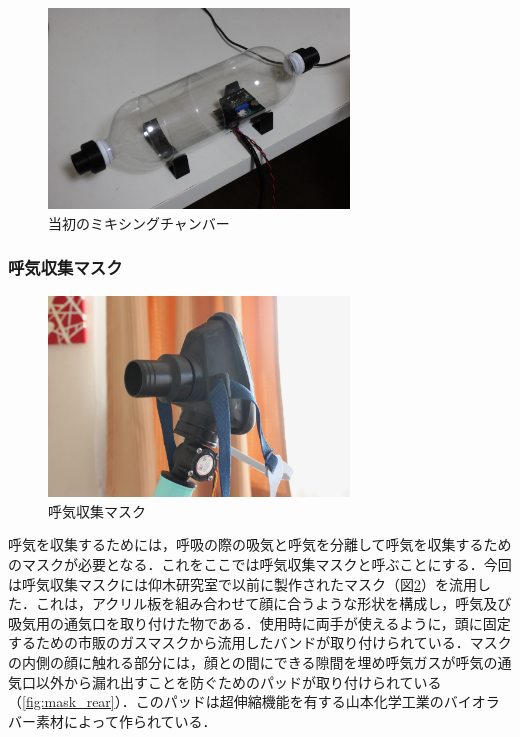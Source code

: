 \begin{figure}[H]
  \begin{center}
    \includegraphics[width=8cm]{fig/mixing_chamber_early}
    \caption{当初のミキシングチャンバー}
    \label{fig:mixing_chamber_early}
  \end{center}
\end{figure}

\subsubsection{呼気収集マスク}

\begin{figure}[H]
  \begin{center}
    \includegraphics[width=8cm]{fig/mask_front}
    \caption{呼気収集マスク}
    \label{fig:mask_front}
  \end{center}
\end{figure}

呼気を収集するためには，呼吸の際の吸気と呼気を分離して呼気を収集するためのマスクが必要となる．これをここでは呼気収集マスクと呼ぶことにする．今回は呼気収集マスクには仰木研究室で以前に製作された\cite{mask_build}マスク（図\ref{fig:mask_front}）を流用した．これは，アクリル板を組み合わせて顔に合うような形状を構成し，呼気及び吸気用の通気口を取り付けた物である．使用時に両手が使えるように，頭に固定するための市販のガスマスクから流用したバンドが取り付けられている．マスクの内側の顔に触れる部分には，顔との間にできる隙間を埋め呼気ガスが呼気の通気口以外から漏れ出すことを防ぐためのパッドが取り付けられている（\ref{fig:mask_rear}）．このパッドは超伸縮機能を有する山本化学工業のバイオラバー素材によって作られている．

